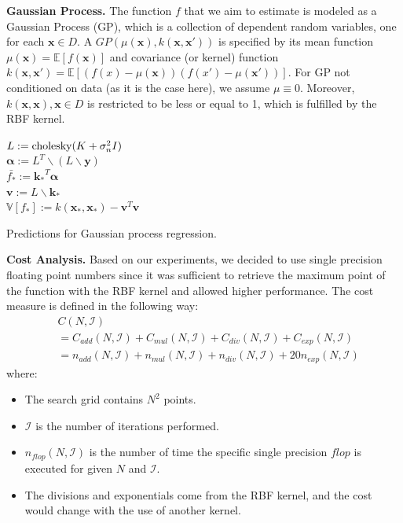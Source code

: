 \documentclass[letterpaper]{article}
\newcommand{\mypar}[1]{{\bf #1.}}
\begin{document}
\mypar{Gaussian Process} The function $f$ that we aim to estimate is modeled as a Gaussian Process (GP), which is a collection of dependent random variables, one for each $\mathbf{x} \in D$. A $GP(\mu(\mathbf{x}), k(\mathbf{x}, \mathbf{x'}))$ is specified by its mean function $\mu(\mathbf{x})=\mathbb{E}[f(\mathbf{x})]$ and covariance (or kernel) function $k(\mathbf{x}, \mathbf{x'})= \mathbb{E}[(f(x)-\mu(\mathbf{x}))(f(x')-\mu(\mathbf{x'}))]$. For GP not conditioned on data (as it is the case here), we assume $\mu \equiv 0$. Moreover, $k(\mathbf{x}, \mathbf{x}), \mathbf{x} \in D$ is restricted to be less or equal to 1, which is fulfilled by the RBF kernel.
\begin{algorithm}
    \label{alg:bayesianupdate}
    $L := \textnormal{cholesky}(K+\sigma^2_nI)$\\
    $\mathbf{\alpha}:=L^T\backslash(L\backslash\mathbf{y})$\\
    $\bar{f_*}:=\mathbf{k_*}^T\mathbf{\alpha}$\\
    $\mathbf{v}:=L\backslash\mathbf{k_*}$\\
    $\mathbb{V}[f_*]:=k(\mathbf{x_*}, \mathbf{x_*})-\mathbf{v}^T\mathbf{v}$\\
    \caption{Predictions for Gaussian process regression. \cite{rasmussen2006gaussian}}
\end{algorithm}


\mypar{Cost Analysis}
Based on our experiments, we decided to use single precision floating point numbers since it was sufficient to retrieve the maximum point of the function with the RBF kernel and allowed higher performance.
The cost measure is defined in the following way:
\begin{align*}
    &C(N,\mathcal{I})\\
    &=C_{add}(N,\mathcal{I}) + C_{mul}(N,\mathcal{I}) + C_{div}(N,\mathcal{I})+C_{exp}(N,\mathcal{I})\\
    &=n_{add}(N,\mathcal{I}) + n_{mul}(N,\mathcal{I}) + n_{div}(N,\mathcal{I}) + 20n_{exp}(N,\mathcal{I})
\end{align*}
where:
\begin{itemize}
    \item The search grid contains $N^2$ points.
    \item $\mathcal{I}$ is the number of iterations performed.
    \item $n_{flop}(N,\mathcal{I})$ is the number of time the specific single precision $flop$ is executed for given $N$ and $\mathcal{I}$.
    \item The divisions and exponentials come from the RBF kernel, and the cost would change with the use of another kernel.
\end{itemize}
\end{document}
